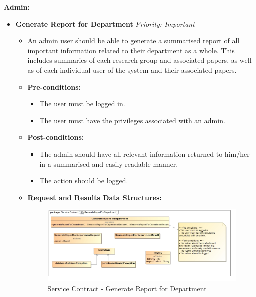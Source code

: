 \documentclass{article}
\begin{document}
				\cleardoublepage
				\textbf{Admin:}
				\begin{itemize}
					\item \textbf{Generate Report for Department} \hfill \textit{Priority: Important}
					\begin{itemize}
						\item An admin user should be able to generate a summarised report of all important information related to their department as a whole. This includes summaries of each research group and associated papers, as well as of each individual user of the system and their associated papers.
						\item \textbf{Pre-conditions:}
						\begin{itemize}
							\item The user must be logged in.
							\item The user must have the privileges associated with an admin.
						\end{itemize}
						\item \textbf{Post-conditions:}
						\begin{itemize}
							\item The admin should have all relevant information returned to him/her in a summarised and easily readable manner.
							\item The action should be logged.
						\end{itemize}
						\item \textbf{Request and Results Data Structures:}
						\begin{figure}[H]
							\includegraphics[width=\linewidth]{../Diagrams/ServiceContracts/Reporting subsystem/GenerateReportForDepartment.jpg}
							\caption{Service Contract - Generate Report for Department}
						\end{figure}
					\end{itemize}


\end{itemize}
\end{document}
